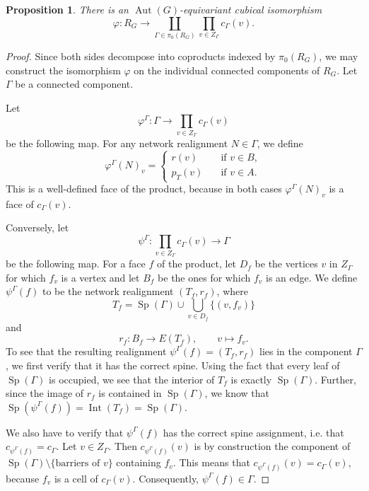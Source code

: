 \documentclass[reqno,dvipsnames]{amsart}
\theoremstyle{plain}
\newtheorem{proposition}[theorem]{Proposition}
\numberwithin{equation}{section}
\theoremstyle{definition}
\DeclareMathOperator{\Int}{Int}
\DeclareMathOperator{\Sp}{Sp}
\DeclareMathOperator{\Aut}{Aut}
\begin{document}
\begin{proposition}\label{cptscontractible}
	There is an $\Aut(G)$-equivariant cubical isomorphism
	\begin{equation}\label{Eq:CubProduct}
		\varphi\colon R_G \to \coprod_{\Gamma\in \pi_0(R_G)}\prod_{v\in Z_\Gamma} c_\Gamma(v).
	\end{equation}
\end{proposition}

\begin{proof}
	Since both sides decompose into coproducts indexed by $\pi_0(R_G)$, we may construct the isomorphism $\varphi$ on the individual connected components of $R_G$. Let $\Gamma$ be a connected component.
	
	Let 
	\[
	\varphi^\Gamma\colon \Gamma \to \prod_{v\in Z_\Gamma} c_\Gamma(v)
	\] 
	be the following map. For any network realignment $N\in \Gamma$, we define
	\[
	\varphi^\Gamma(N)_v = \begin{cases}
		r(v) \quad 		&\text{if }v\in B,\\
		p_T(v) \quad 	&\text{if }v\in A.
	\end{cases}
	\] 
	This is a well-defined face of the product, because in both cases $\varphi^\Gamma(N)_v$ is a face of $c_\Gamma(v)$.
	
	Conversely, let 
	\[
	\psi^\Gamma\colon \prod_{v\in Z_\Gamma} c_\Gamma(v)\to \Gamma 
	\] 
	be the following map. For a face $f$ of the product, let $D_f$ be the vertices $v$ in $Z_\Gamma$ for which $f_v$ is a vertex and let $B_f$ be the ones for which $f_v$ is an edge. We define $\psi^\Gamma(f)$ to be the network realignment $(T_f,r_f)$, where 
	\[
	T_f = \Sp(\Gamma) \cup \bigcup_{v\in D_f}\{(v,f_v)\}
	\]
	and 
	\[
	r_f\colon B_f \to E(T_f),\qquad v\mapsto f_v.
	\]
	To see that the resulting realignment $\psi^\Gamma(f) = (T_f, r_f)$ lies in the component $\Gamma$, we first verify that it has the correct spine. Using the fact that every leaf of $\Sp(\Gamma)$ is occupied, we see that the interior of $T_f$ is exactly $\Sp(\Gamma)$. Further, since the image of $r_f$ is contained in $\Sp(\Gamma)$, we know that $\Sp(\psi^\Gamma(f)) = \Int(T_f) = \Sp(\Gamma)$.
	
	We also have to verify that $\psi^\Gamma(f)$ has the correct spine assignment, i.e. that $c_{\psi^\Gamma(f)} = c_\Gamma$. Let $v\in Z_\Gamma$. Then $c_{\psi^\Gamma(f)}(v)$ is by construction the component of $\Sp(\Gamma)\setminus \{\text{barriers of }v\}$ containing $f_v$. This means that $c_{\psi^\Gamma(f)}(v) = c_\Gamma(v)$, because $f_v$ is a cell of $c_\Gamma(v)$. Consequently, $\psi^\Gamma(f) \in \Gamma$.
	

\end{proof}
\end{document}
